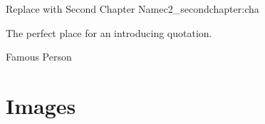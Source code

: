 
\begin{chapterpage}{Replace with Second Chapter Name}{c2_secondchapter:cha}

\begin{myquotation} The perfect place for an introducing quotation.\par\vspace*{15mm}
\mbox{}\hfill \emdash{}Famous Person
\par\end{myquotation}

\end{chapterpage}



\section{Images}\label{c1_images:sec}

